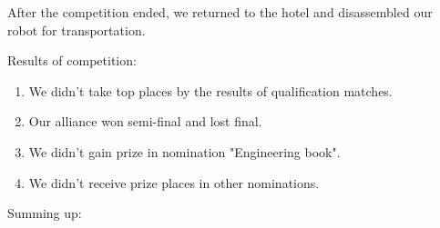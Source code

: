 After the competition ended, we returned to the hotel and disassembled our robot for transportation.

Results of competition:
\begin{enumerate}
	\item We didn't take top places by the results of qualification matches.
	
	\item Our alliance won semi-final and lost final.
	
	\item We didn't gain prize in nomination "Engineering book".
	
	\item We didn't receive prize places in other nominations.
\end{enumerate}

Summing up:
